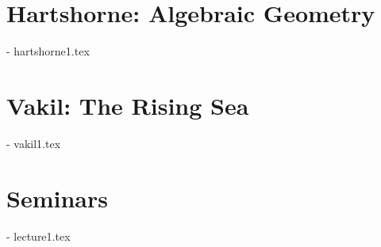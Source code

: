 \section{Hartshorne: Algebraic Geometry}
- hartshorne1.tex

\section{Vakil: The Rising Sea}
- vakil1.tex

\section{Seminars}
- lecture1.tex

